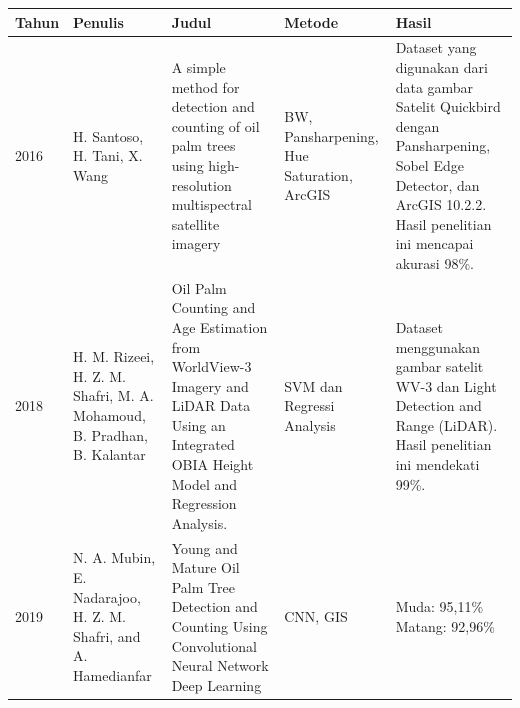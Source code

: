 \begin{singlespace}
	\begin{table}[H]
		\centering
		\begin{tabular}{|p{2cm}|p{2cm}|p{2cm}|p{2cm}|p{2cm}|}	
			\hline
			Tahun & Penulis & Judul & Metode & Hasil \\ \hline
			2016  & H. Santoso, H. Tani, X. Wang                                           & A simple method for detection and counting of oil palm trees using high-resolution multispectral satellite imagery                                   & BW, Pansharpening, Hue Saturation, ArcGIS                                                                                                                                       & Dataset yang digunakan dari data gambar Satelit Quickbird dengan Pansharpening, Sobel Edge Detector, dan ArcGIS 10.2.2. Hasil penelitian ini mencapai akurasi 98\%.                                                                                                                                               \\ \hline
			2018  & H. M. Rizeei, H. Z. M. Shafri, M. A. Mohamoud, B. Pradhan, B. Kalantar & Oil Palm Counting and Age Estimation from WorldView-3 Imagery and LiDAR Data Using an Integrated OBIA Height Model and Regression Analysis.          & SVM dan Regressi Analysis                                                                                                                                                       & Dataset menggunakan gambar satelit WV-3 dan Light Detection and Range (LiDAR). Hasil penelitian ini mendekati 99\%.                                                                                                                                                                                               \\ \hline
			2019  & N. A. Mubin, E. Nadarajoo, H. Z. M. Shafri, and A. Hamedianfar         & Young and Mature Oil Palm Tree Detection and Counting Using Convolutional Neural Network Deep Learning                                               & CNN, GIS                                                                                                                                                                        & Muda: 95,11\% Matang: 92,96\%                                                                                                                                                                                                                                                                                     \\ \hline
		\end{tabular}
	\end{table}
\end{singlespace}

